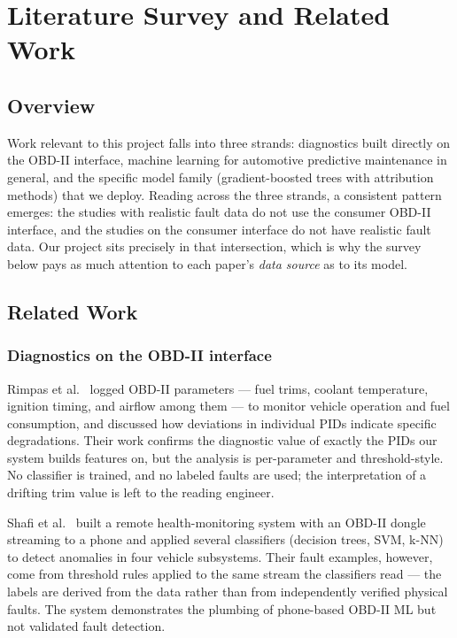 \section{Literature Survey and Related Work}
\label{ch:literature}

\subsection{Overview}

Work relevant to this project falls into three strands: diagnostics built
directly on the OBD-II interface, machine learning for automotive predictive
maintenance in general, and the specific model family (gradient-boosted
trees with attribution methods) that we deploy. Reading across the three
strands, a consistent pattern emerges: the studies with realistic fault data
do not use the consumer OBD-II interface, and the studies on the consumer
interface do not have realistic fault data. Our project sits precisely in
that intersection, which is why the survey below pays as much attention to
each paper's \emph{data source} as to its model.

\subsection{Related Work}

\subsubsection{Diagnostics on the OBD-II interface}

Rimpas et al.~\cite{rimpas2020} logged OBD-II parameters --- fuel trims,
coolant temperature, ignition timing, and airflow among them --- to monitor
vehicle operation and fuel consumption, and discussed how deviations in
individual PIDs indicate specific degradations. Their work confirms the
diagnostic value of exactly the PIDs our system builds features on, but the
analysis is per-parameter and threshold-style. No classifier is trained, and
no labeled faults are used; the interpretation of a drifting trim value is
left to the reading engineer.

Shafi et al.~\cite{shafi2018} built a remote health-monitoring system with
an OBD-II dongle streaming to a phone and applied several classifiers
(decision trees, SVM, k-NN) to detect anomalies in four vehicle subsystems.
Their fault examples, however, come from threshold rules applied to the same
stream the classifiers read --- the labels are derived from the data rather
than from independently verified physical faults. The system demonstrates
the plumbing of phone-based OBD-II ML but not validated fault detection.

